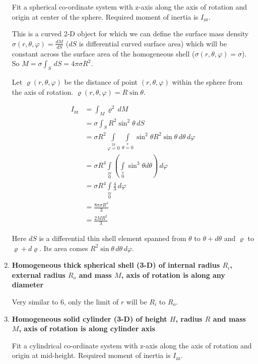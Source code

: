 \documentclass[a4paper,10pt]{article}
\begin{document}
\begin{enumerate}
Fit a spherical co-ordinate system with z-axis along the axis of rotation and origin at center of the sphere. Required moment of inertia is $I_{\text{zz}}$.

This is a curved 2-D object for which we can define the surface mass density $\sigma(r, \theta, \varphi) = \frac{dM}{dS}$ ($dS$ is differential curved surface area) which will be constant across the surface area of the homogeneous shell ($\sigma(r, \theta, \varphi) = \sigma$). So $M = \sigma\int_S \,dS = 4\pi\sigma R^2$.

Let $\varrho(r, \theta, \varphi)$ be the distance of point $(r, \theta, \varphi)$ within the sphere from the axis of rotation. $\varrho(r, \theta, \varphi) = R\sin{\theta}$.

\begin{align*}
I_\text{zz} &= \int_M \varrho^2 \,dM\\
&= \sigma\int_S R^2 \sin^2{\theta} \,dS\\
&= \sigma R^2\int\limits_{\varphi=0}\limits^{2\pi}
\int\limits_{\theta=0}\limits^{\pi}
\sin^2{\theta}R^2 \sin{\theta} \,d\theta \,d\varphi\\
&= \sigma R^4\int\limits_0\limits^{2\pi}
\left(\int\limits_0\limits^{\pi}
\sin^3{\theta} d\theta\right)\,d\varphi\\
&= \sigma R^4\int\limits_0\limits^{2\pi}
\frac{4}{3}\,d\varphi\\
&= \frac{8\pi\sigma R^4}{3}\\
&= \frac{2MR^2}{3}
\end{align*}

Here $dS$ is a differential thin shell element spanned from $\theta$ to $\theta+d\theta$ and $\varrho$ to $\varrho+d\varrho$. Its area comes $R^2 \sin{\theta} \,d\theta \,d\varphi$.

\item \textbf{Homogeneous thick spherical shell (3-D) of internal radius $R_i$, external radius $R_o$ and mass $M$, axis of rotation is along any diameter}

Very similar to 6, only the limit of $r$ will be $R_i$ to $R_o$.

\item \textbf{Homogeneous solid cylinder (3-D) of height $H$, radius $R$ and mass $M$, axis of rotation is along cylinder axis}

Fit a cylindrical co-ordinate system with z-axis along the axis of rotation and origin at mid-height. Required moment of inertia is $I_{\text{zz}}$.


\end{enumerate}
\end{document}
